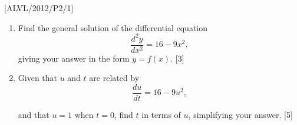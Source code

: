 \item {[}ALVL/2012/P2/1{]}
\begin{enumerate}
\item Find the general solution of the differential equation 
\[
\frac{d^{2}y}{dx^{2}}=16-9x^{2},
\]
 giving your answer in the form $y=f\left(x\right)$. {[}3{]} 
\item Given that $u$ and $t$ are related by 
\[
\frac{du}{dt}=16-9u^{2},
\]

and that $u=1$ when $t=0$, find $t$ in terms of $u$, simplifying
your answer. {[}5{]}
\end{enumerate}
